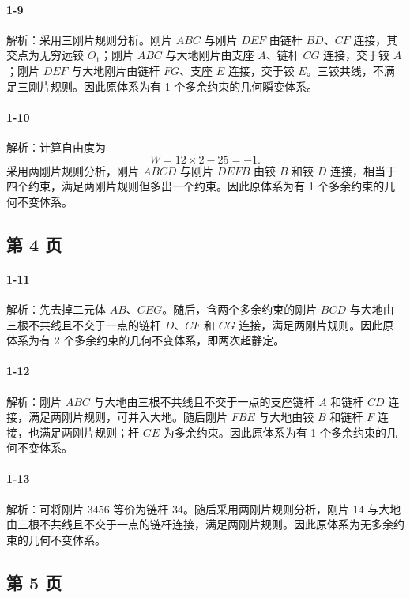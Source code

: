 \paragraph{1-9}
解析：采用三刚片规则分析。刚片 $ABC$ 与刚片 $DEF$ 由链杆 $BD$、$CF$ 连接，其交点为无穷远铰 $O_1$；刚片 $ABC$ 与大地刚片由支座 $A$、链杆 $CG$ 连接，交于铰 $A$；刚片 $DEF$ 与大地刚片由链杆 $FG$、支座 $E$ 连接，交于铰 $E$。三铰共线，不满足三刚片规则。因此原体系为有 1 个多余约束的几何瞬变体系。

\paragraph{1-10}
解析：计算自由度为
\[
W=12\times 2-25=-1.
\]
采用两刚片规则分析，刚片 $ABCD$ 与刚片 $DEFB$ 由铰 $B$ 和铰 $D$ 连接，相当于四个约束，满足两刚片规则但多出一个约束。因此原体系为有 1 个多余约束的几何不变体系。

\subsection*{第 4 页}

\paragraph{1-11}
解析：先去掉二元体 $AB$、$CEG$。随后，含两个多余约束的刚片 $BCD$ 与大地由三根不共线且不交于一点的链杆 $D$、$CF$ 和 $CG$ 连接，满足两刚片规则。因此原体系为有 2 个多余约束的几何不变体系，即两次超静定。

\paragraph{1-12}
解析：刚片 $ABC$ 与大地由三根不共线且不交于一点的支座链杆 $A$ 和链杆 $CD$ 连接，满足两刚片规则，可并入大地。随后刚片 $FBE$ 与大地由铰 $B$ 和链杆 $F$ 连接，也满足两刚片规则；杆 $GE$ 为多余约束。因此原体系为有 1 个多余约束的几何不变体系。

\paragraph{1-13}
解析：可将刚片 $3456$ 等价为链杆 $34$。随后采用两刚片规则分析，刚片 $14$ 与大地由三根不共线且不交于一点的链杆连接，满足两刚片规则。因此原体系为无多余约束的几何不变体系。

\subsection*{第 5 页}

